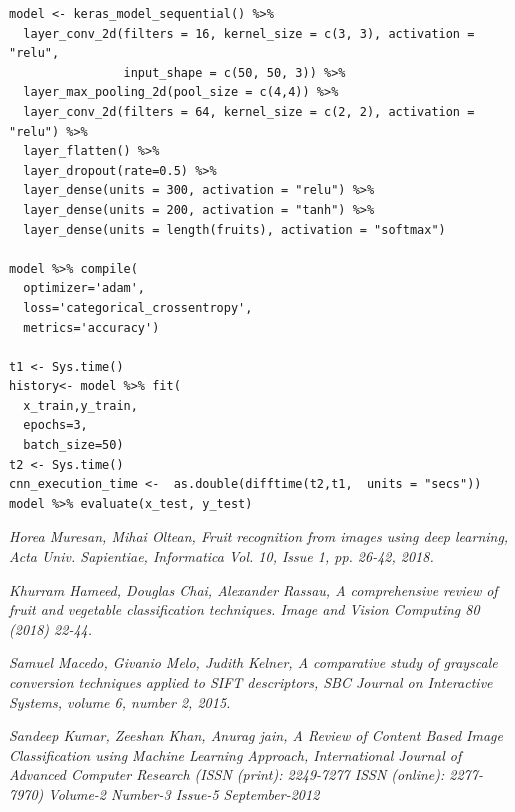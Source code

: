 \documentclass{article}
\begin{document}
\begin{verbatim}
model <- keras_model_sequential() %>%
  layer_conv_2d(filters = 16, kernel_size = c(3, 3), activation = "relu",
                input_shape = c(50, 50, 3)) %>%
  layer_max_pooling_2d(pool_size = c(4,4)) %>%
  layer_conv_2d(filters = 64, kernel_size = c(2, 2), activation = "relu") %>%
  layer_flatten() %>%
  layer_dropout(rate=0.5) %>%
  layer_dense(units = 300, activation = "relu") %>%
  layer_dense(units = 200, activation = "tanh") %>%
  layer_dense(units = length(fruits), activation = "softmax")

model %>% compile(
  optimizer='adam',
  loss='categorical_crossentropy',
  metrics='accuracy')

t1 <- Sys.time()
history<- model %>% fit(
  x_train,y_train,
  epochs=3,
  batch_size=50)
t2 <- Sys.time()
cnn_execution_time <-  as.double(difftime(t2,t1,  units = "secs"))
model %>% evaluate(x_test, y_test)

\end{verbatim}

\newpage
\begin{thebibliography}{9}

\textit{Horea Muresan, Mihai Oltean, Fruit recognition from images using deep learning, Acta Univ. Sapientiae, Informatica Vol. 10, Issue 1, pp. 26-42, 2018.}

\textit{Khurram Hameed, Douglas Chai, Alexander Rassau, A comprehensive review of fruit and vegetable classification techniques. Image and Vision Computing 80 (2018) 22-44.} 

\textit{Samuel Macedo, Givanio Melo, Judith Kelner, A comparative study of grayscale conversion techniques applied to SIFT descriptors, SBC Journal on Interactive Systems, volume 6, number 2, 2015.}

\textit{Sandeep Kumar, Zeeshan Khan, Anurag jain, A Review of Content Based Image Classification using Machine Learning Approach, International Journal of Advanced Computer Research (ISSN (print): 2249-7277 ISSN (online): 2277-7970) Volume-2 Number-3 Issue-5 September-2012}

\end{thebibliography} 
\end{document}
